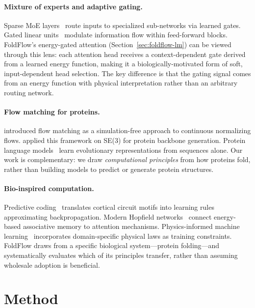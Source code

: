\documentclass[10pt]{article}
\begin{document}
\paragraph{Mixture of experts and adaptive gating.}
Sparse MoE layers~\citep{shazeer2017outrageously, fedus2022switch}
route inputs to specialized sub-networks via learned gates.  Gated
linear units~\citep{dauphin2017language, shazeer2020glu} modulate
information flow within feed-forward blocks.  FoldFlow's energy-gated
attention (Section~\ref{sec:foldflow-lm}) can be viewed through this
lens: each attention head receives a context-dependent gate derived from
a learned energy function, making it a biologically-motivated form of
soft, input-dependent head selection.  The key difference is that the
gating signal comes from an energy function with physical interpretation
rather than an arbitrary routing network.

\paragraph{Flow matching for proteins.}
\citet{lipman2023flow} introduced flow matching as a simulation-free
approach to continuous normalizing flows.  \citet{bose2024se3stochastic}
applied this framework on SE(3) for protein backbone generation.  Protein
language models~\citep{lin2023evolutionary} learn evolutionary
representations from sequences alone.  Our work is complementary: we draw
\emph{computational principles} from how proteins fold, rather than
building models to predict or generate protein structures.

\paragraph{Bio-inspired computation.}
Predictive coding~\citep{millidge2021predictive} translates cortical
circuit motifs into learning rules approximating backpropagation.
Modern Hopfield networks~\citep{ramsauer2020hopfield} connect
energy-based associative memory to attention mechanisms.
Physics-informed machine learning~\citep{karniadakis2021physics}
incorporates domain-specific physical laws as training constraints.
FoldFlow draws from a specific biological system---protein
folding---and systematically evaluates which of its principles transfer,
rather than assuming wholesale adoption is beneficial.

\section{Method}
\label{sec:method}
\end{document}
